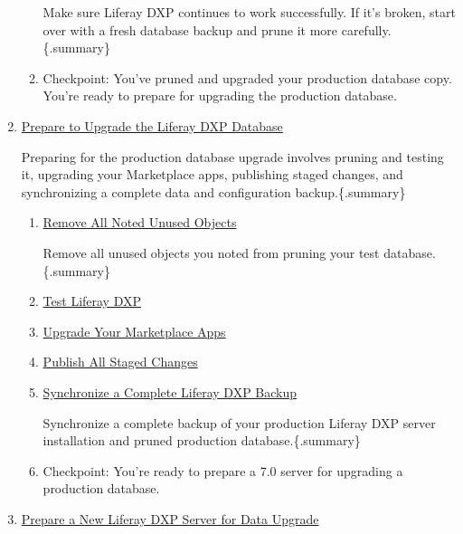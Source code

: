 \begin{enumerate}
\begin{enumerate}
    Make sure Liferay DXP continues to work successfully. If it's
    broken, start over with a fresh database backup and prune it more
    carefully.\{.summary\}
  \item
    Checkpoint: You've pruned and upgraded your production database
    copy. You're ready to prepare for upgrading the production database.
  \end{enumerate}
\item
  \href{/docs/7-2/deploy/-/knowledge_base/d/preparing-to-upgrade-the-product-database}{Prepare
  to Upgrade the Liferay DXP Database}

  Preparing for the production database upgrade involves pruning and
  testing it, upgrading your Marketplace apps, publishing staged
  changes, and synchronizing a complete data and configuration
  backup.\{.summary\}

  \begin{enumerate}
  \def\labelenumii{\arabic{enumii}.}
  \item
    \href{/docs/7-2/deploy/-/knowledge_base/d/preparing-to-upgrade-the-product-database\#remove-all-unused-objects-you-identified-earlier}{Remove
    All Noted Unused Objects}

    Remove all unused objects you noted from pruning your test
    database.\{.summary\}
  \item
    \href{/docs/7-2/deploy/-/knowledge_base/d/preparing-to-upgrade-the-product-database\#test-using-the-pruned-database}{Test
    Liferay DXP}
  \item
    \href{/docs/7-2/deploy/-/knowledge_base/d/preparing-to-upgrade-the-product-database\#upgrade-your-marketplace-apps}{Upgrade
    Your Marketplace Apps}
  \item
    \href{/docs/7-2/deploy/-/knowledge_base/d/preparing-to-upgrade-the-product-database\#publish-all-staged-changes-to-production}{Publish
    All Staged Changes}
  \item
    \href{/docs/7-2/deploy/-/knowledge_base/d/preparing-to-upgrade-the-product-database\#synchronize-a-complete-backup}{Synchronize
    a Complete Liferay DXP Backup}

    Synchronize a complete backup of your production Liferay DXP server
    installation and pruned production database.\{.summary\}
  \item
    Checkpoint: You're ready to prepare a 7.0 server for upgrading a
    production database.
  \end{enumerate}
\item
  \href{/docs/7-2/deploy/-/knowledge_base/d/preparing-a-new-product-server-for-data-upgrade}{Prepare
  a New Liferay DXP Server for Data Upgrade}


\end{enumerate}
